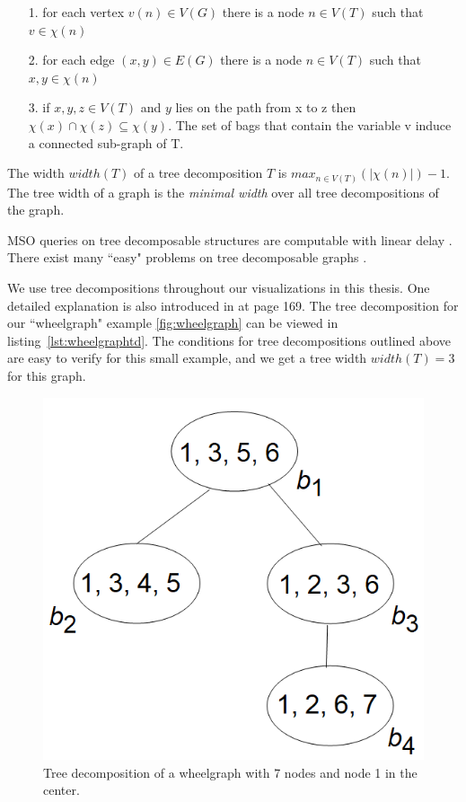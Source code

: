 \documentclass[a4paper, 12pt, bibliography=totoc]{scrartcl}
\begin{document}
\begin{itemize}
	\item[1.] for each vertex $v(n) \in V(G)$ there is a node $n \in V(T)$ such that $v \in \chi(n)$
	\item[2.] for each edge $(x,y) \in E(G)$ there is a node $n\in V(T)$ such that $x,y \in\chi(n)$
	\item[3.] if $x,y,z \in V(T)$ and $y$ lies on the path from x to z then $\chi(x) \cap \chi(z) \subseteq \chi(y)$. The set of bags that contain the variable v induce a connected sub-graph of T.
\end{itemize}
The width $width(T)$ of a tree decomposition $T$ is $max_{n\in V(T)}(|\chi(n)|)-1$.
The tree width of a graph is the \textit{minimal width} over all tree decompositions of the graph. 


MSO queries on tree decomposable structures are computable with linear delay \cite{MSOQueriesGuillaume}. There exist many ``easy" problems on tree decomposable graphs \cite{ARNBORG1991308}.

We use tree decompositions throughout our visualizations in this thesis. One detailed explanation is also introduced in \cite{pcgp2019} at page 169.
The tree decomposition for our ``wheelgraph" example \ref{fig:wheelgraph} can be viewed in listing~\ref{lst:wheelgraphtd}. The conditions for tree decompositions outlined above are easy to verify for this small example, and we get a tree width $width(T)=3$ for this graph.

\begin{figure}
	\centering
	\includegraphics[]{images/TDWheelgraph7.png}
	\caption{Tree decomposition of a wheelgraph with 7 nodes and node 1 in the center.}
	\label{fig:tdweelgraph7}
\end{figure}
\end{document}
